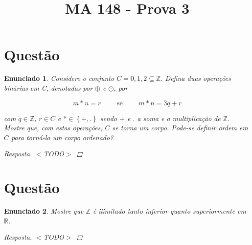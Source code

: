\documentclass[a4paper,twoside,11pt]{article}
\newtheorem*{enunciado}{Enunciado}
\begin{document}
\title{MA 148 - Prova 3}
\author{}
\date{}
\maketitle



\section{Questão}
\begin{enunciado}
    Considere o conjunto $C = {0, 1, 2} \subseteq \mathbb{Z}$.
    Defina duas operações binárias em C, denotadas por $\oplus$ e $\odot$, por

    $$m \ast n = r \qquad \text{ se } \qquad m \ast n = 3q + r$$

    com $q \in \mathbb{Z}$, $r \in C$ e $\ast \in \left\{ +, . \right\}$ sendo
    $+$ e $.$ a soma e a multiplicação de $\mathbb{Z}$. Mostre que, com estas
    operações, $C$ se torna um corpo. Pode-se definir ordem em $C$ para
    torná-lo um corpo ordenado?

    \begin{proof}[Resposta]
        $<$TODO$>$
    \end{proof}
\end{enunciado}

\section{Questão}
\begin{enunciado}
    Mostre que $\mathbb{Z}$ é ilimitado tanto inferior quanto superiormente em
    $\mathbb{R}$.

    \begin{proof}[Resposta]
        $<$TODO$>$
    \end{proof}
\end{enunciado}
\end{document}
